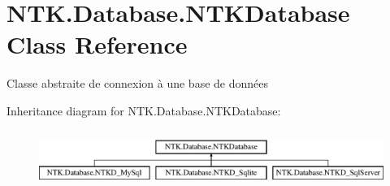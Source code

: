 \hypertarget{class_n_t_k_1_1_database_1_1_n_t_k_database}{}\section{N\+T\+K.\+Database.\+N\+T\+K\+Database Class Reference}
\label{class_n_t_k_1_1_database_1_1_n_t_k_database}


Classe abstraite de connexion à une base de données  


Inheritance diagram for N\+T\+K.\+Database.\+N\+T\+K\+Database\+:\begin{figure}[H]
\begin{center}
\leavevmode
\includegraphics[height=1.857380cm]{d9/dfa/class_n_t_k_1_1_database_1_1_n_t_k_database}
\end{center}
\end{figure}
